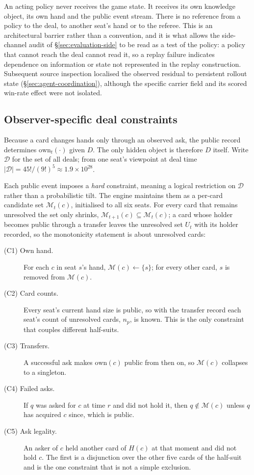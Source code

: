 An acting policy never receives the game state. It receives its own knowledge object, its own hand
and the public event stream. There is no reference from a policy to the deal, to another seat's hand
or to the referee. This is an architectural barrier rather than a convention, and it is what allows
the side-channel audit of \S\ref{sec:evaluation-side} to be read as a test of the policy: a policy
that cannot reach the deal cannot read it, so a replay failure indicates dependence on information
or state not represented in the replay construction. Subsequent source inspection localised the
observed residual to persistent rollout state (\S\ref{sec:agent-coordination}), although the
specific carrier field and its scored win-rate effect were not isolated.

\subsection{Observer-specific deal constraints}
\label{sec:inference-constraints}

Because a card changes hands only through an observed ask, the public record determines
$\mathrm{own}_t(\cdot)$ given $D$. The only hidden object is therefore $D$ itself. Write
$\mathcal{D}$ for the set of all deals; from one seat's viewpoint at deal time
$|\mathcal{D}| = 45!/(9!)^5 \approx 1.9 \times 10^{28}$.

Each public event imposes a \emph{hard} constraint, meaning a logical restriction on $\mathcal{D}$
rather than a probabilistic tilt. The engine maintains them as a per-card candidate set
$\mathcal{M}_t(c)$, initialised to all six seats. For every card that remains unresolved the set
only shrinks, $\mathcal{M}_{t+1}(c) \subseteq \mathcal{M}_t(c)$; a card whose holder becomes public
through a transfer leaves the unresolved set $U_t$ with its holder recorded, so the monotonicity
statement is about unresolved cards:

\begin{description}
\item[(C1) Own hand.] For each $c$ in seat $s$'s hand, $\mathcal{M}(c) \leftarrow \{s\}$; for every
  other card, $s$ is removed from $\mathcal{M}(c)$.
\item[(C2) Card counts.] Every seat's current hand size is public, so with the transfer record each
  seat's count of unresolved cards, $n_p$, is known. This is the only constraint that couples
  different half-suits.
\item[(C3) Transfers.] A successful ask makes $\mathrm{own}(c)$ public from then on, so
  $\mathcal{M}(c)$ collapses to a singleton.
\item[(C4) Failed asks.] If $q$ was asked for $c$ at time $r$ and did not hold it, then $q \notin
  \mathcal{M}(c)$ unless $q$ has acquired $c$ since, which is public.
\item[(C5) Ask legality.] An asker of $c$ held another card of $H(c)$ at that moment and did not hold
  $c$. The first is a disjunction over the other five cards of the half-suit and is the one
  constraint that is not a simple exclusion.
\end{description}

